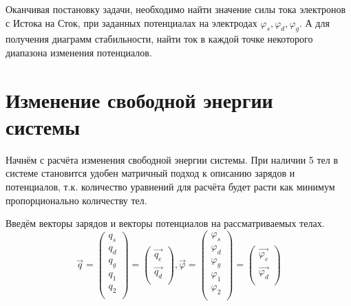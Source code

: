 \documentclass[12pt,a4paper]{report}
\begin{document}
Оканчивая постановку задачи, необходимо найти значение силы тока электронов с Истока на Сток, при заданных потенциалах на электродах $\varphi_s, \varphi_d, \varphi_g$. А для получения диаграмм стабильности, найти ток в каждой точке некоторого диапазона изменения потенциалов.

\section{Изменение свободной энергии системы}
Начнём с расчёта изменения свободной энергии системы. При наличии 5 тел в системе становится удобен матричный подход к описанию зарядов и потенциалов, т.к. количество уравнений для расчёта будет расти как минимум пропорционально количеству тел.

Введём векторы зарядов и векторы потенциалов на рассматриваемых телах.
\begin{equation}
\vec{q} =  \left(
  \begin{array}{c}
    q_s\\
    q_d\\
    q_g\\
    q_1\\
    q_2\\
  \end{array}
  \right) = \left(
  \begin{array}{c}
  \vec{q_e}\\
  \vec{q_d}\\
  \end{array}
  \right)
  , 
  \vec{\varphi} = \left(
  \begin{array}{c}
  \varphi_s\\
  \varphi_d\\
  \varphi_g\\
  \varphi_1\\
  \varphi_2\\
  \end{array}
  \right) = \left(
  \begin{array}{c}
  \vec{\varphi_e}\\
  \vec{\varphi_d}\\
  \end{array}
  \right)
\end{equation}
\end{document}
